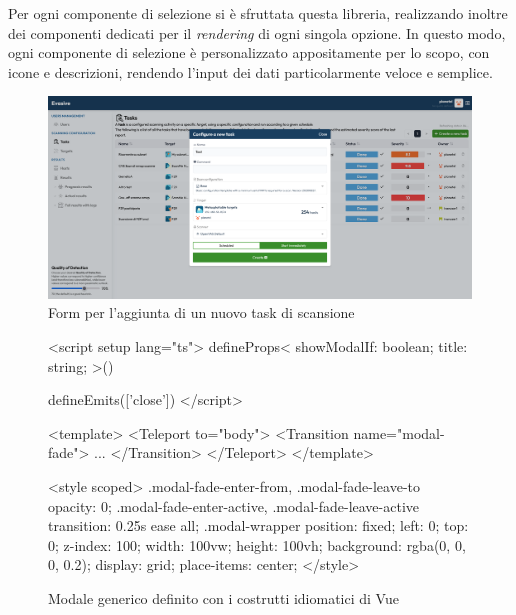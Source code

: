 Per ogni componente di selezione si è sfruttata questa libreria, realizzando inoltre dei componenti dedicati per il \emph{rendering} di ogni singola opzione. In questo modo, ogni componente di selezione è personalizzato appositamente per lo scopo, con icone e descrizioni, rendendo l'input dei dati particolarmente veloce e semplice.

\begin{figure}[!h]
\centering
\includegraphics[width=\textwidth]{img/form-task-now.png}
\caption{Form per l'aggiunta di un nuovo task di scansione}
\end{figure}

\begin{figure}[b]
\begin{vuesfc}
<script setup lang="ts">
defineProps<{
  showModalIf: boolean;
  title: string;
}>()

defineEmits(['close'])
</script>

<template>
  <Teleport to="body">
    <Transition name="modal-fade">
      ...
    </Transition>
  </Teleport>
</template>

<style scoped>
.modal-fade-enter-from,
.modal-fade-leave-to {
  opacity: 0;
}
.modal-fade-enter-active,
.modal-fade-leave-active {
  transition: 0.25s ease all;
}
.modal-wrapper {
  position: fixed;
  left: 0;
  top: 0;
  z-index: 100;
  width: 100vw;
  height: 100vh;
  background: rgba(0, 0, 0, 0.2);
  display: grid;
  place-items: center;
}
</style>
\end{vuesfc}
\caption{Modale generico definito con i costrutti idiomatici di Vue}
\end{figure}